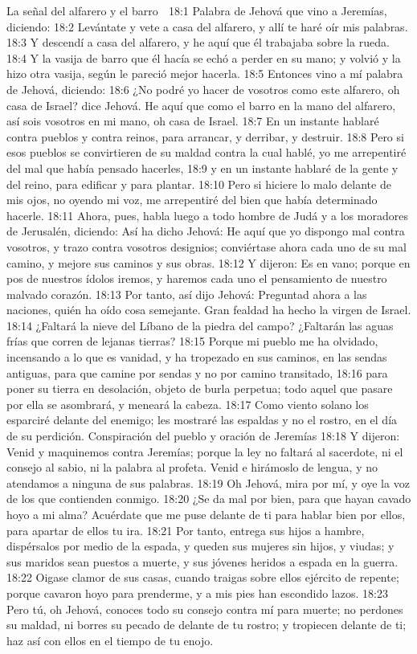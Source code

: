 La señal del alfarero y el barro  

18:1 Palabra de Jehová que vino a Jeremías, diciendo:  
18:2 Levántate y vete a casa del alfarero, y allí te haré oír mis palabras.  
18:3 Y descendí a casa del alfarero, y he aquí que él trabajaba sobre la rueda.  
18:4 Y la vasija de barro que él hacía se echó a perder en su mano; y volvió y la hizo otra vasija, según le pareció mejor hacerla.  
18:5 Entonces vino a mí palabra de Jehová, diciendo:  
18:6 ¿No podré yo hacer de vosotros como este alfarero, oh casa de Israel? dice Jehová. He aquí que como el barro en la mano del alfarero, así sois vosotros en mi mano, oh casa de Israel.  
18:7 En un instante hablaré contra pueblos y contra reinos, para arrancar, y derribar, y destruir.  
18:8 Pero si esos pueblos se convirtieren de su maldad contra la cual hablé, yo me arrepentiré del mal que había pensado hacerles,  
18:9 y en un instante hablaré de la gente y del reino, para edificar y para plantar.  
18:10 Pero si hiciere lo malo delante de mis ojos, no oyendo mi voz, me arrepentiré del bien que había determinado hacerle.  
18:11 Ahora, pues, habla luego a todo hombre de Judá y a los moradores de Jerusalén, diciendo: Así ha dicho Jehová: He aquí que yo dispongo mal contra vosotros, y trazo contra vosotros designios; conviértase ahora cada uno de su mal camino, y mejore sus caminos y sus obras.  
18:12 Y dijeron: Es en vano; porque en pos de nuestros ídolos iremos, y haremos cada uno el pensamiento de nuestro malvado corazón.  
18:13 Por tanto, así dijo Jehová: Preguntad ahora a las naciones, quién ha oído cosa semejante. Gran fealdad ha hecho la virgen de Israel.  
18:14 ¿Faltará la nieve del Líbano de la piedra del campo? ¿Faltarán las aguas frías que corren de lejanas tierras? 
18:15 Porque mi pueblo me ha olvidado, incensando a lo que es vanidad, y ha tropezado en sus caminos, en las sendas antiguas, para que camine por sendas y no por camino transitado,  
18:16 para poner su tierra en desolación, objeto de burla perpetua; todo aquel que pasare por ella se asombrará, y meneará la cabeza.  
18:17 Como viento solano los esparciré delante del enemigo; les mostraré las espaldas y no el rostro, en el día de su perdición.  
Conspiración del pueblo y oración de Jeremías  
18:18 Y dijeron: Venid y maquinemos contra Jeremías; porque la ley no faltará al sacerdote, ni el consejo al sabio, ni la palabra al profeta. Venid e hirámoslo de lengua, y no atendamos a ninguna de sus palabras.  
18:19 Oh Jehová, mira por mí, y oye la voz de los que contienden conmigo.  
18:20 ¿Se da mal por bien, para que hayan cavado hoyo a mi alma? Acuérdate que me puse delante de ti para hablar bien por ellos, para apartar de ellos tu ira.  
18:21 Por tanto, entrega sus hijos a hambre, dispérsalos por medio de la espada, y queden sus mujeres sin hijos, y viudas; y sus maridos sean puestos a muerte, y sus jóvenes heridos a espada en la guerra.  
18:22 Oigase clamor de sus casas, cuando traigas sobre ellos ejército de repente; porque cavaron hoyo para prenderme, y a mis pies han escondido lazos.  
18:23 Pero tú, oh Jehová, conoces todo su consejo contra mí para muerte; no perdones su maldad, ni borres su pecado de delante de tu rostro; y tropiecen delante de ti; haz así con ellos en el tiempo de tu enojo.  

